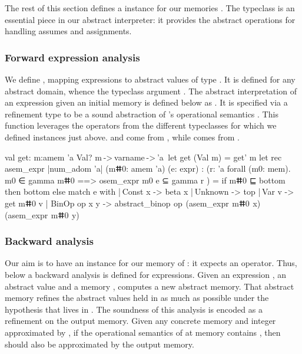 \documentclass{llncs}
\begin{document}
%
The rest of this section defines a  instance for
our memories .
%
The typeclass  is an essential piece in our
abstract interpreter: it provides the abstract operations for
handling assumes and assignments.
%
\subsubsection{Forward expression analysis}
%
We define , mapping expressions to abstract
values of type .
%
It is defined for any abstract domain, whence the typeclass
argument
%
.
%
The abstract interpretation of an expression  given
 an initial memory is defined below as
%
.
%
It is specified via a refinement type to be a sound abstraction of
's operational semantics .
%
This function leverages the operators from the different
typeclasses for which we defined instances just above.
%
 and  come
from , while  comes from
.
%
\begin{fstarcode}
val get: m:amem 'a {Val? m} -> varname -> 'a     let get (Val m) = get' m
let rec asem_expr {|num_adom 'a|} (mⵌ0: amem 'a) (e: expr)
 : (r: 'a { forall (m0: mem). m0 ∈ gamma mⵌ0 ==> osem_expr m0 e ⊆ gamma r })
 = if mⵌ0 ⊑ bottom then bottom else
   match e with | Const x -> beta x | Unknown -> top | Var v -> get mⵌ0 v
   | BinOp op x y -> abstract_binop  op  (asem_expr  mⵌ0  x) (asem_expr  mⵌ0  y)
\end{fstarcode}
%
\subsubsection{Backward analysis}
%
Our aim is to have an instance for our memory of :
it expects an  operator. Thus, below a backward
analysis is defined for expressions.
%
Given an expression , an abstract value  and a
memory ,  computes a new
abstract memory.
%
That abstract memory refines the abstract values held in
 as much as possible under the hypothesis that 
lives in .
%
The soundness of this analysis is encoded as a refinement on the
output memory. Given any concrete memory  and integer
 approximated by , if the operational semantics of
 at memory  contains , then 
should also be approximated by the output memory.
%
\end{document}
